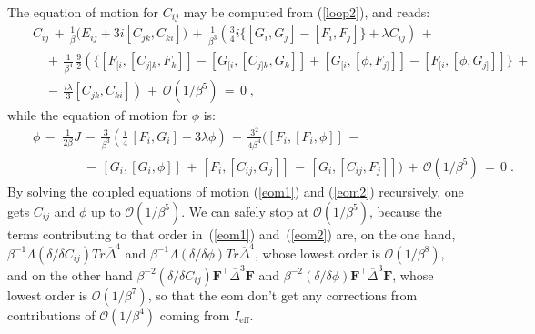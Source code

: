 \documentclass[a4paper,11pt]{article}
\begin{document}
The equation of motion for $C_{ij}$ may be
computed from (\ref{loop2}), and reads:
\begin{eqnarray}
&&C_{ij}\,+\,\frac{1}{\beta }\Big( E_{ij}+3i[C_{jk},C_{ki}]\Big) \,+\,
\frac{1}{\beta ^{3}}\left( \frac{3}{4}i\Big\{
[G_{i},G_{j}]-[F_{i},F_{j}]\Big\}+\lambda C_{ij}\right) \,+  \nonumber \\
&&\quad +\,\frac{1}{\beta ^{4}}\, \frac{9}{2}\left(\Big\{[F_{[i},[C_{j]k},F_{k}]]-[G_{[i},[C_{j]k},G_{k}]]+
[G_{[i},[\phi,F_{j]}]]-[F_{[i},[\phi ,G_{j]}]]\Big\} \right.\,+\nonumber\\
&&\quad-\,\left.\frac{i\lambda}{3}[C_{jk},C_{ki}]\right)  
\,+\,\mathcal{O}(1/\beta ^{5})\,=\,0\;,  \label{eom1}
\end{eqnarray}
while the equation of motion for $\phi$ is:
\begin{eqnarray}
&&\phi \,-\,\,\frac{1}{2\beta }J\,-\,\frac{3}{\beta ^{3}}\left( \frac{i}{4}\,[F_{i},G_{i}]-
3\lambda \phi \right) \,+\,
\frac{3^2}{4\beta^{4}}\bigg([F_{i},[F_{i},\phi]]\,- \nonumber \\
&&\qquad \qquad -\,[G_{i},[G_{i},\phi]]\,+\,[F_{i},[C_{ij},G_{j}]]\,-\,[G_{i},[C_{ij},F_{j}]]\bigg) \,+\,
\mathcal{O}(1/\beta ^{5})\,=\,0\;.  \label{eom2}
\end{eqnarray}
By solving the coupled equations of motion (\ref{eom1}) and (\ref{eom2}) recursively, 
one gets $C_{ij}$ and $\phi $ up to $\mathcal{O}(1/\beta ^{5})$. 
We can safely stop at $\mathcal{O}(1/\beta ^{5})$, because the terms contributing to that order
in~(\ref{eom1}) and~(\ref{eom2}) are, on the one hand, 
$\beta^{-1}\Lambda (\delta /\delta C_{ij})Tr\overline{\Delta }^4$ and 
$\beta^{-1}\Lambda (\delta /\delta \phi )Tr\overline{\Delta }^4$, whose lowest order
is $\mathcal{O}(1/\beta ^{8})$, and on the other hand $\beta ^{-2}(\delta
/\delta C_{ij})\mathbf{F}^{\intercal }\overline{\Delta }^3\mathbf{F}$ and $
\beta ^{-2}(\delta /\delta \phi )\mathbf{F}^{\intercal }\overline{\Delta }^3
\mathbf{F}$, whose lowest order is $\mathcal{O}(1/\beta ^{7})$, so that the eom don't get 
any corrections from contributions of $\mathcal{O}(1/\beta ^{4})$ coming from $I_{\text{eff}}$.
\end{document}
